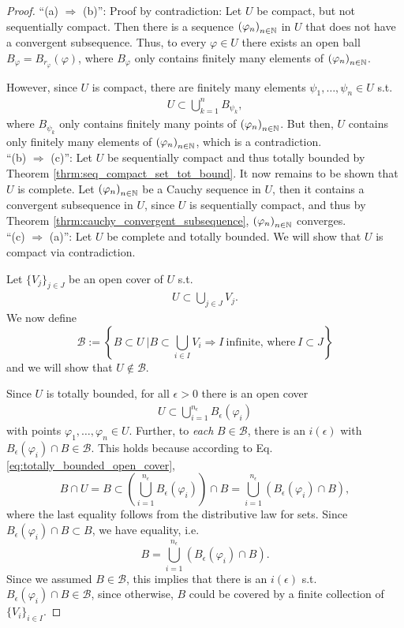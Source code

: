 \begin{proof}
	\enquote{(a) $\Longrightarrow$ (b)}: Proof by contradiction: Let $U$ be compact, but not sequentially compact. Then there is a sequence $\seq[\varphi_n]$ in $U$ that does not have a convergent subsequence. Thus, to every $\varphi\in U$ there exists an open ball $B_{\varphi} = B_{r_\varphi}(\varphi)$, where $B_{\varphi}$ only contains finitely many elements of $\seq[\varphi_n]$.
	
	However, since $U$ is compact, there are finitely many elements $\psi_1, \dots, \psi_n\in U$ s.t. 
	\begin{align*}
		U \subset \bigcup_{k=1}^{n}B_{\psi_k}, 
	\end{align*}
	where $B_{\psi_k}$ only contains finitely many points of $\seq[\varphi_n]$. But then, $U$ contains only finitely many elements of $\seq[\varphi_n]$, which is a contradiction.
	\\
	
	\enquote{(b) $\Longrightarrow$ (c)}: Let $U$ be sequentially compact and thus totally bounded by Theorem \eqref{thrm:seq_compact_set_tot_bound}. It now remains to be shown that $U$ is complete. Let $\seq[\varphi_n]$ be a Cauchy sequence in $U$, then it contains a convergent subsequence in $U$, since $U$ is sequentially compact, and thus by Theorem \ref{thrm:cauchy_convergent_subsequence}, $\seq[\varphi_n]$ converges.
	\\
	
	\enquote{(c) $\Longrightarrow$ (a)}: Let $U$ be complete and totally bounded. We will show that $U$ is compact via contradiction.
	
	Let $\{V_j\}_{j\in J}$ be an open cover of $U$ s.t. 
	\begin{align}\label{eq:open_cover}
		U\subset \bigcup_{j\in J}V_j.
	\end{align}
	We now define
	$$\mathcal B := \left\{ \left.B\subset U\ \right\vert B\subset \bigcup_{i\in I}V_i\Rightarrow I\ \text{infinite, where}\ I \subset J \right\}$$
	and we will show that $U\notin \mathcal B$.
	
	Since $U$ is totally bounded, for all $\epsilon > 0$ there is an open cover
	\begin{align}\label{eq:totally_bounded_open_cover}
		U\subset \bigcup_{i=1}^{n_{\epsilon}}B_{\epsilon}(\varphi_i)
	\end{align}
	with points $\varphi_1, \dots, \varphi_n\in U$. Further, to \textit{each} $B\in\mathcal B$, there is an $i(\epsilon)$ with $B_{\epsilon}(\varphi_i)\cap B\in\mathcal B$. This holds because according to Eq. \eqref{eq:totally_bounded_open_cover}, $$B\cap U = B \subset \left(\bigcup_{i=1}^{n_{\epsilon}}B_{\epsilon}(\varphi_i)\right) \cap B = \bigcup_{i=1}^{n_{\epsilon}}\left(B_{\epsilon}(\varphi_i) \cap B\right),$$ where the last equality follows from the distributive law for sets. Since $B_{\epsilon}(\varphi_i) \cap B \subset B$, we have equality, i.e. $$B = \bigcup_{i=1}^{n_{\epsilon}}\left(B_{\epsilon}(\varphi_i) \cap B\right).$$ Since we assumed $B\in\mathcal B$, this implies that there is an $i(\epsilon)$ s.t. $B_{\epsilon}(\varphi_i)\cap B\in \mathcal B$, since otherwise, $B$ could be covered by a finite collection of $\{V_i\}_{i\in I}$.
	

\end{proof}
